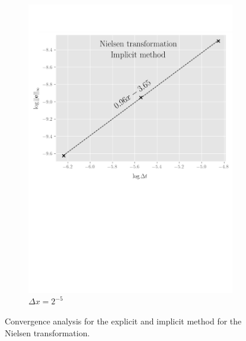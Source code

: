 \begin{figure}[tbp]
\begin{subfigure}{0.4\textwidth}
    \includegraphics[width=\textwidth]{chapters/chapter3/ConvergenceTimeImplicitNielsen.pdf}
    \caption{$\Delta{t}=2^{-7},2^{-8},\dots,2^{-10}$}
    \caption*{$\Delta{x}=2^{-5}$}
  \end{subfigure}
  \caption{Convergence analysis for the explicit and implicit method for the Nielsen transformation.}
  \label{fig:finitedifferencesschemes:numericaresults:nielsen_convergence analysis}
\end{figure}

